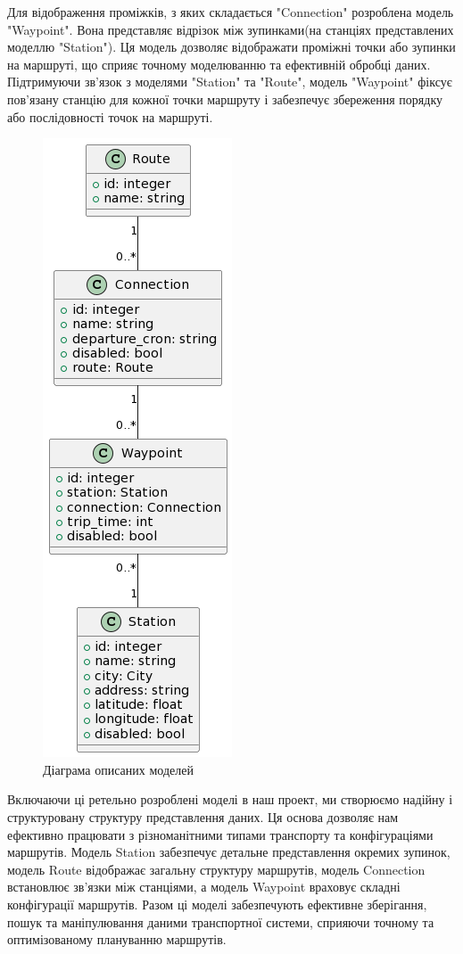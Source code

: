 Для відображення проміжків, з яких складається "Connection" розроблена модель "Waypoint". Вона представляє відрізок між зупинками(на станціях представлених моделлю "Station"). Ця модель дозволяє відображати проміжні точки або зупинки на маршруті, що сприяє точному моделюванню та ефективній обробці даних. Підтримуючи зв'язок з моделями "Station" та "Route", модель "Waypoint" фіксує пов'язану станцію для кожної точки маршруту і забезпечує збереження порядку або послідовності точок на маршруті.

\begin{figure}[!h]
    \centering
    \includegraphics[scale=0.6]{content/chapters/2-implementation-methods/assets/img/models_diagram.png}
    \caption{Діаграма описаних моделей}
    \label{fig:bfs}
\end{figure}


Включаючи ці ретельно розроблені моделі в наш проект, ми створюємо надійну і структуровану структуру представлення даних. Ця основа дозволяє нам ефективно працювати з різноманітними типами транспорту та конфігураціями маршрутів. Модель Station забезпечує детальне представлення окремих зупинок, модель Route відображає загальну структуру маршрутів, модель Connection встановлює зв'язки між станціями, а модель Waypoint враховує складні конфігурації маршрутів. Разом ці моделі забезпечують ефективне зберігання, пошук та маніпулювання даними транспортної системи, сприяючи точному та оптимізованому плануванню маршрутів.